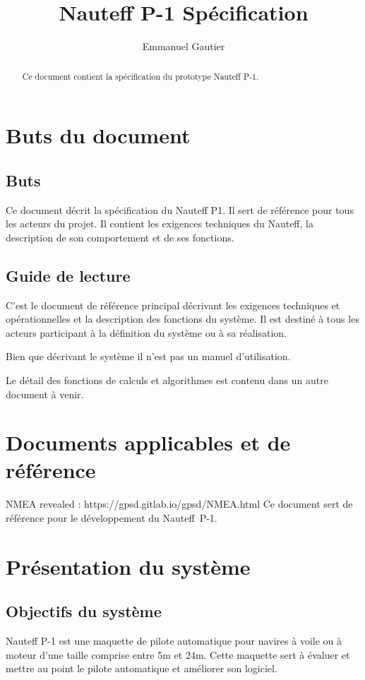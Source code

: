 \documentclass[a4paper,11pt]{report}
\title{Nauteff P-1 Spécification}
\author{Emmanuel Gautier}
\begin{document}
\maketitle

\begin{abstract}
Ce document contient la spécification du prototype Nauteff P-1.
\end{abstract}

\tableofcontents

\chapter{Buts du document}
\section{Buts}
Ce document décrit la spécification du Nauteff P1. Il sert de référence
pour tous les acteurs du projet.
Il contient les exigences techniques du Nauteff,
la description de son comportement et de ses fonctions. 

\section{Guide de lecture}
C'est le document de référence principal décrivant
les exigences techniques et opérationnelles et la description
des fonctions du système. Il est destiné à tous les acteurs
participant à la définition du système ou à sa réalisation.

Bien que décrivant le système il n'est pas un manuel d'utilisation.

Le détail des fonctions de calculs et algorithmes est contenu
dans un autre document à venir.

\chapter{Documents applicables et de référence}

NMEA revealed : https://gpsd.gitlab.io/gpsd/NMEA.html
Ce document sert de référence pour le développement du Nauteff~P-1.

\printglossary[numberedsection, title=Terminologie]

\chapter{Présentation du système}
\section{Objectifs du système}
Nauteff P-1 est une maquette de pilote automatique pour navires à voile ou à moteur d'une taille comprise entre 5m et 24m.
Cette maquette sert à évaluer et mettre au point le pilote automatique et améliorer son logiciel.
\end{document}
